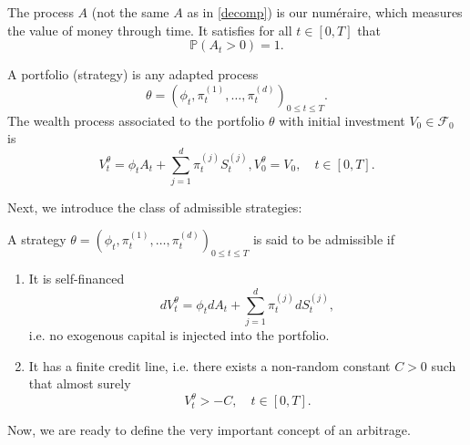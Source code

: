 The process $A$ (not the same $A$ as in \eqref{decomp}) is our numéraire, which measures the value of money through time. It satisfies for all $t\in [0,T]$ that
\begin{equation}
    \mathbb{P}(A_{t}>0)=1.
\end{equation}
\begin{defn}
    A portfolio (strategy) is any adapted process
    \begin{equation}
        \theta=(\phi_{t},\pi_{t}^{(1)},\dots,\pi_{t}^{(d)})_{0\leq t\leq T}.
    \end{equation}
    The wealth process associated to the portfolio $\theta$ with initial investment $V_{0}\in \mathcal{F}_{0}$ is
    \begin{equation}
        V_{t}^{\theta}=\phi_{t}A_{t}+\sum_{j=1}^{d}\pi_{t}^{(j)}S_{t}^{(j)}, V_{0}^{\theta}=V_{0}, \quad t\in [0,T].
    \end{equation}
\end{defn}
Next, we introduce the class of admissible strategies:
\begin{defn}
    A strategy $\theta=(\phi_{t},\pi_{t}^{(1)},\dots,\pi_{t}^{(d)})_{0\leq t\leq T}$ is said to be admissible if
    \begin{enumerate}
        \item It is self-financed
        \begin{equation}
            dV_{t}^{\theta}=\phi_{t}dA_{t}+\sum_{j=1}^{d}\pi_{t}^{(j)}dS_{t}^{(j)},
        \end{equation}
        i.e. no exogenous capital is injected into the portfolio.
        \item It has a finite credit line, i.e. there exists a non-random constant $C>0$ such that almost surely
        \begin{equation}
            V_{t}^{\theta}>-C, \quad t\in [0,T].
        \end{equation}
    \end{enumerate}
\end{defn}
Now, we are ready to define the very important concept of an arbitrage.
